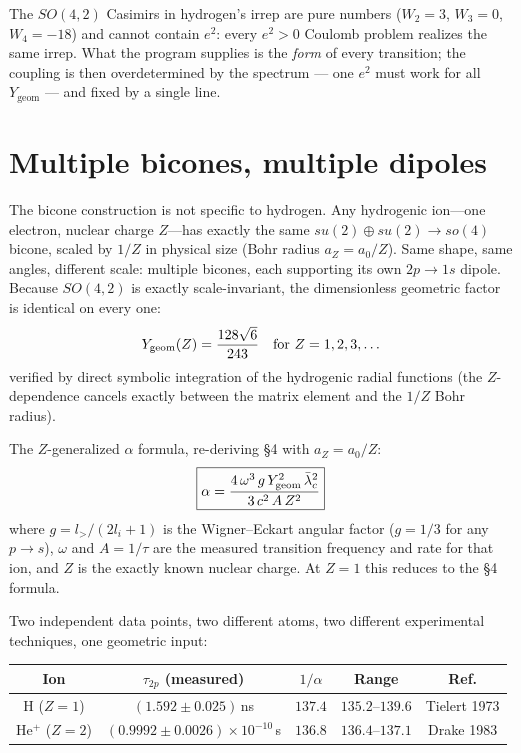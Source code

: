 \documentclass[11pt]{amsart}
\theoremstyle{remark}
\begin{document}
The $SO(4,2)$ Casimirs in hydrogen's irrep are pure numbers
($W_2=3$, $W_3=0$, $W_4=-18$) and cannot contain $e^2$: every
$e^2>0$ Coulomb problem realizes the same irrep.  What the program
supplies is the \emph{form} of every transition; the coupling is then
overdetermined by the spectrum --- one $e^2$ must work for all
$Y_{\mathrm{geom}}$ --- and fixed by a single line.

\section{Multiple bicones, multiple dipoles}

The bicone construction is not specific to hydrogen.  Any hydrogenic
ion---one electron, nuclear charge $Z$---has exactly the same
$su(2)\oplus su(2)\to so(4)$ bicone, scaled by $1/Z$ in physical size
(Bohr radius $a_Z=a_0/Z$).  Same shape, same angles, different scale:
multiple bicones, each supporting its own $2p\to1s$ dipole.  Because
$SO(4,2)$ is exactly scale-invariant, the dimensionless geometric
factor is identical on every one:
\begin{equation}
Y_{\rm geom}(Z) = \frac{128\sqrt6}{243}\quad\text{for }Z=1,2,3,\ldots
\end{equation}
verified by direct symbolic integration of the hydrogenic radial
functions (the $Z$-dependence cancels exactly between the matrix
element and the $1/Z$ Bohr radius).

The $Z$-generalized $\alpha$ formula, re-deriving \S4 with $a_Z=a_0/Z$:
\begin{equation}\label{eq:alphaZ}
\boxed{\alpha = \frac{4\,\omega^3\,g\,Y_{\rm geom}^2\,\bar\lambda_c^2}
{3\,c^2\,A\,Z^2}}
\end{equation}
where $g=l_>/(2l_i+1)$ is the Wigner--Eckart angular factor
($g=1/3$ for any $p\to s$), $\omega$ and $A=1/\tau$ are the measured
transition frequency and rate for that ion, and $Z$ is the exactly
known nuclear charge.  At $Z=1$ this reduces to the \S4 formula.

Two independent data points, two different atoms, two different
experimental techniques, one geometric input:

\begin{center}
\begin{tabular}{c|c|c|c|c}
Ion & $\tau_{2p}$ (measured) & $1/\alpha$ & Range & Ref. \\ \hline
H ($Z=1$) & $(1.592\pm0.025)\,$ns & $137.4$ & $135.2$--$139.6$ & Tielert 1973 \\
He$^+$ ($Z=2$) & $(0.9992\pm0.0026)\times10^{-10}\,$s & $136.8$ &
$136.4$--$137.1$ & Drake 1983 \\
\end{tabular}
\end{center}
\end{document}
